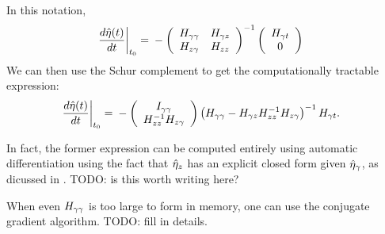 In this notation,
%
\begin{align*}
%
\fracat{d \etaopt(\t)}{d \t}{\t_0} ={}&
-\left(
\begin{array}{cc}
   \hess{\gamma\gamma} & \hess{\gamma\z} \\
   \hess{\z\gamma}     & \hess{\z\z} \\
\end{array}
\right)^{-1}
\left( \begin{array}{c} \hess{\gamma\t} \\ 0 \end{array}\right)
%
\end{align*}
%
We can then use the Schur complement to get the computationally tractable
expression:
%
\begin{align*}
%
\fracat{d \etaopt(\t)}{d \t}{\t_0} ={}&
-\left(\begin{array}{c}
I_{\gamma\gamma} \\
\hess{\z\z}^{-1} \hess{\z\gamma}
\end{array}\right)
\left(\hess{\gamma\gamma} -
      \hess{\gamma\z} \hess{\z\z}^{-1} \hess{\z\gamma}\right)^{-1} \hess{\gamma\t}.
%
\end{align*}

In fact, the former expression can be computed entirely using automatic
differentiation using the fact that $\hat\eta_{z}$ has an explicit closed form given
$\hat\eta_{\gamma}$, as dicussed in .  TODO: is this worth writing
here?

When even $H_{\gamma\gamma}$ is too large to form in memory, one can
use the conjugate gradient algorithm.  TODO: fill in details.
